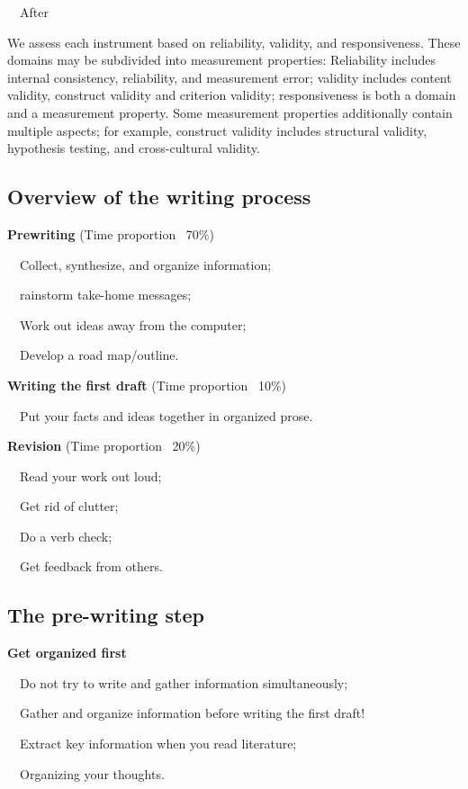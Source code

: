 \documentclass[a4paper, 12pt]{article}
\begin{document}
\par\ \textbullet\ After
\par We assess each instrument based on reliability, validity, and responsiveness.
These domains may be subdivided into measurement properties: Reliability includes internal consistency,
reliability, and measurement error; validity includes content validity, construct validity and criterion validity;
responsiveness is both a domain and a measurement property. Some measurement properties additionally contain multiple aspects;
for example, construct validity includes structural validity, hypothesis testing, and cross-cultural validity.

\newpage\subsection{Overview of the writing process}

\textbf{Prewriting} (Time proportion ~70\%)
\par\ \textbullet\ Collect, synthesize, and organize information;
\par\ \textbullet\ rainstorm take-home messages;
\par\ \textbullet\ Work out ideas away from the computer;
\par\ \textbullet\ Develop a road map/outline.

\textbf{Writing the first draft} (Time proportion ~10\%)
\par\ \textbullet\ Put your facts and ideas together in organized prose.

\textbf{Revision} (Time proportion ~20\%)
\par\ \textbullet\ Read your work out loud;
\par\ \textbullet\ Get rid of clutter;
\par\ \textbullet\ Do a verb check;
\par\ \textbullet\ Get feedback from others.

\newpage\subsection{The pre-writing step}
\textbf{Get organized first}
\par\ \textbullet\ Do not try to write and gather information simultaneously;
\par\ \textbullet\ Gather and organize information before writing the first draft!
\par\ \textbullet\ Extract key information when you read literature;
\par\ \textbullet\ Organizing your thoughts.
\end{document}
